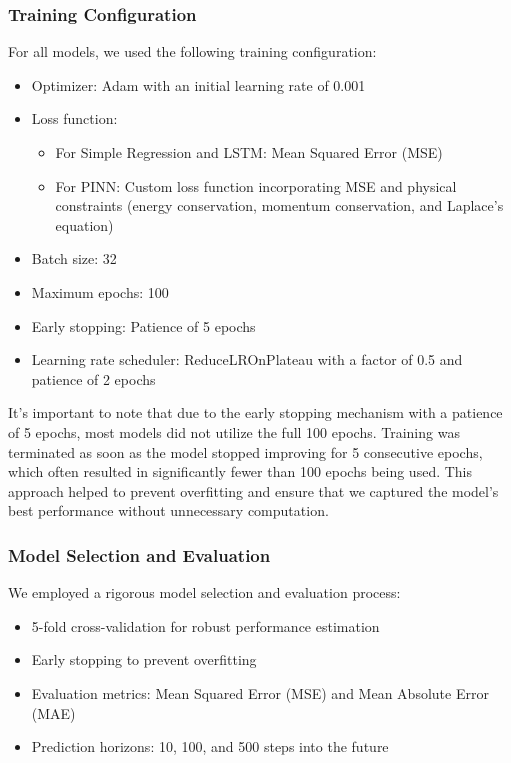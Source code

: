 \documentclass[12pt,a4paper]{article}
\begin{document}
\subsubsection{Training Configuration}
For all models, we used the following training configuration:
\begin{itemize}
    \item Optimizer: Adam with an initial learning rate of 0.001
    \item Loss function:
    \begin{itemize}
        \item For Simple Regression and LSTM: Mean Squared Error (MSE)
        \item For PINN: Custom loss function incorporating MSE and physical constraints (energy conservation, momentum conservation, and Laplace's equation)
    \end{itemize}
    \item Batch size: 32
    \item Maximum epochs: 100
    \item Early stopping: Patience of 5 epochs
    \item Learning rate scheduler: ReduceLROnPlateau with a factor of 0.5 and patience of 2 epochs
\end{itemize}

It's important to note that due to the early stopping mechanism with a patience of 5 epochs, most models did not utilize the full 100 epochs. Training was terminated as soon as the model stopped improving for 5 consecutive epochs, which often resulted in significantly fewer than 100 epochs being used. This approach helped to prevent overfitting and ensure that we captured the model's best performance without unnecessary computation.

\subsubsection{Model Selection and Evaluation}
We employed a rigorous model selection and evaluation process:
\begin{itemize}
    \item 5-fold cross-validation for robust performance estimation
    \item Early stopping to prevent overfitting
    \item Evaluation metrics: Mean Squared Error (MSE) and Mean Absolute Error (MAE)
    \item Prediction horizons: 10, 100, and 500 steps into the future
\end{itemize}
\end{document}
